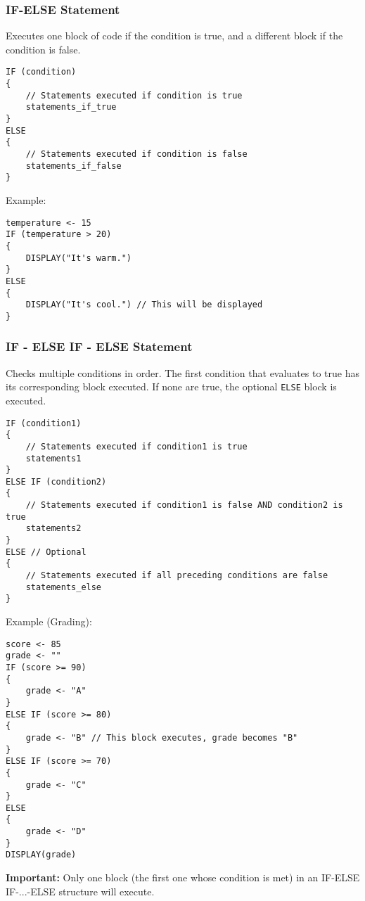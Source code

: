 \documentclass[11pt,oneside]{book}
\begin{document}
\subsubsection*{IF-ELSE Statement}
Executes one block of code if the condition is true, and a different block if the condition is false.
\begin{lstlisting}[language={}, label={lst:if_else}, caption={AP Pseudocode: IF-ELSE}]
IF (condition)
{
    // Statements executed if condition is true
    statements_if_true
}
ELSE
{
    // Statements executed if condition is false
    statements_if_false
}
\end{lstlisting}
Example:
\begin{lstlisting}[language={}]
temperature <- 15
IF (temperature > 20)
{
    DISPLAY("It's warm.")
}
ELSE
{
    DISPLAY("It's cool.") // This will be displayed
}
\end{lstlisting}

\subsubsection*{IF - ELSE IF - ELSE Statement}
Checks multiple conditions in order. The first condition that evaluates to true has its corresponding block executed. If none are true, the optional \texttt{ELSE} block is executed.
\begin{lstlisting}[language={}, label={lst:if_elseif_else}, caption={AP Pseudocode: IF - ELSE IF - ELSE}]
IF (condition1)
{
    // Statements executed if condition1 is true
    statements1
}
ELSE IF (condition2)
{
    // Statements executed if condition1 is false AND condition2 is true
    statements2
}
ELSE // Optional
{
    // Statements executed if all preceding conditions are false
    statements_else
}
\end{lstlisting}
Example (Grading):
\begin{lstlisting}[language={}, label={lst:grading_example}]
score <- 85
grade <- ""
IF (score >= 90)
{
    grade <- "A"
}
ELSE IF (score >= 80)
{
    grade <- "B" // This block executes, grade becomes "B"
}
ELSE IF (score >= 70)
{
    grade <- "C"
}
ELSE
{
    grade <- "D"
}
DISPLAY(grade)
\end{lstlisting}
\textbf{Important:} Only one block (the first one whose condition is met) in an IF-ELSE IF-...-ELSE structure will execute.
\end{document}
